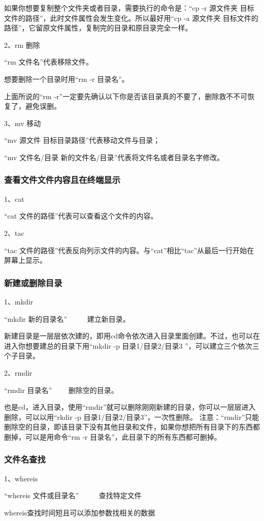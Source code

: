 \documentclass{article}
\begin{document}
 如果你想要复制整个文件夹或者目录，需要执行的命令是：“cp -r 源文件夹 目标文件的路径”，此时文件属性会发生变化。所以最好用“cp -a 源文件夹 目标文件的路径”，它留原文件属性，复制完的目录和原目录完全一样。

2、rm 删除

“rm 文件名”代表移除文件。

想要删除一个目录时用“rm -r 目录名”。

{\color{blue}上面所说的“rm -r”一定要先确认以下你是否该目录真的不要了，删除救不不可恢复了，避免误删}。

3、mv 移动

“mv 源文件 目标目录路径”代表移动文件与目录；

“mv 文件名/目录 新的文件名/目录”代表将文件名或者目录名字修改。

\subsubsection{查看文件文件内容且在终端显示}
1、cat

“cat 文件的路径”代表可以查看这个文件的内容。

2、tac

“tac 文件的路径”代表反向列示文件的内容。与“cat”相比“tac”从最后一行开始在屏幕上显示。
\subsubsection{新建或删除目录}
1、mkdir

“mkdir 新的目录名”  ~~~~~建立新目录。

新建目录是一层层依次建的，即用cd命令依次进入目录里面创建。不过，也可以在进入你想要建总的目录下用“mkdir -p 目录1/目录2/目录3 ”，可以建立三个依次三个子目录。

2、rmdir

“rmdir 目录名”  ~~~~删除空的目录。

也是cd，进入目录，使用“rmdir”就可以删除刚刚新建的目录，你可以一层层进入删除，可以以用“rkdir -p 目录1/目录2/目录3”，一次性删除。
{\color{red}注意：}“{\color{red}rmdir}”只能删除{\color{red}空的目录}，即该目录下没有其他目录和文件，如果你想把所有目录下的东西都删掉，可以是用命令“rm -r 目录名”，此目录下的所有东西都可删掉。
\subsubsection{文件名查找}
1、whereis

“whereis 文件或目录名”  ~~~~~查找特定文件

whereis查找时间短且可以添加参数找相关的数据
\end{document}
